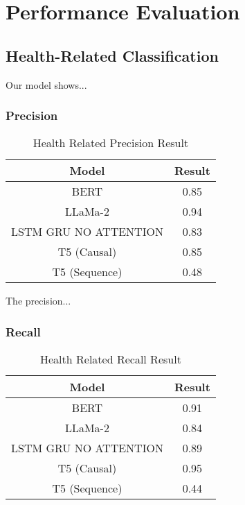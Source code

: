 


\chapter{Performance Evaluation}  

\section{Health-Related Classification}
Our model shows...

\subsection{Precision}
\begin{table}[ht!]
	\centering
	\caption{Health Related Precision Result}
	\begin{tabular}{||c | c||} 
		\hline
		\textbf{Model} & \textbf{Result} \\ [0.5ex] 
		\hline
		BERT & 0.85  \\
		\hline
		LLaMa-2 & 0.94 \\ 
		\hline
		LSTM GRU NO ATTENTION & 0.83  \\
		\hline
		T5 (Causal) & 0.85 \\
		\hline
		T5 (Sequence) & 0.48 \\
		\hline
	\end{tabular}
	\label{table:HealthPrecision}
\end{table}

The precision...


\subsection{Recall}
\begin{table}[ht!]
	\centering
	\caption{Health Related Recall Result}
	\begin{tabular}{||c | c||} 
		\hline
		\textbf{Model} & \textbf{Result} \\ [0.5ex] 
		\hline
		BERT & 0.91  \\
		\hline
		LLaMa-2 & 0.84 \\ 
		\hline
		LSTM GRU NO ATTENTION & 0.89  \\
		\hline
		T5 (Causal) & 0.95 \\
		\hline
		T5 (Sequence) & 0.44 \\
		\hline
	\end{tabular}
	\label{table:HealthRecall}
\end{table}

